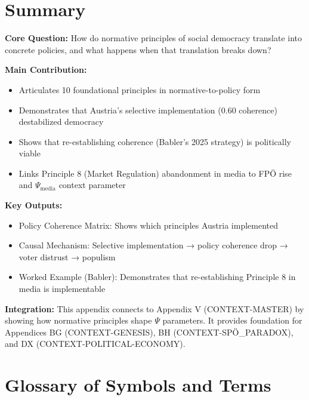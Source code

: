 \section{Summary}
\label{sec:bf-summary}

\begin{tcolorbox}[colback=green!10!white, colframe=green!75!black,
    title=Appendix BF: Summary]

\textbf{Core Question:} How do normative principles of social democracy translate into concrete policies, and what happens when that translation breaks down?

\textbf{Main Contribution:}
\begin{itemize}[nosep]
    \item Articulates 10 foundational principles in normative-to-policy form
    \item Demonstrates that Austria's selective implementation (0.60 coherence) destabilized democracy
    \item Shows that re-establishing coherence (Babler's 2025 strategy) is politically viable
    \item Links Principle 8 (Market Regulation) abandonment in media to FPÖ rise and $\Psi_{\text{media}}$ context parameter
\end{itemize}

\textbf{Key Outputs:}
\begin{itemize}[nosep]
    \item Policy Coherence Matrix: Shows which principles Austria implemented
    \item Causal Mechanism: Selective implementation → policy coherence drop → voter distrust → populism
    \item Worked Example (Babler): Demonstrates that re-establishing Principle 8 in media is implementable
\end{itemize}

\textbf{Integration:} This appendix connects to Appendix V (CONTEXT-MASTER) by showing how normative principles shape $\Psi$ parameters. It provides foundation for Appendices BG (CONTEXT-GENESIS), BH (CONTEXT-SPÖ_PARADOX), and DX (CONTEXT-POLITICAL-ECONOMY).

\end{tcolorbox}


\section{Glossary of Symbols and Terms}
\label{sec:bf-glossary}

